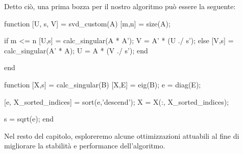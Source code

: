 Detto ciò, una prima bozza per il nostro algoritmo può essere la seguente:
\begin{programma}
function [U, s, V] = svd_custom(A)
[m,n] = size(A);

if m <= n
   	[U,s] = calc_singular(A * A');
   	V = A' * (U ./ s');
else
   	[V,s] = calc_singular(A' * A);
    U = A * (V ./ s');
end

end


function [X,s] = calc_singular(B)
[X,E] = eig(B);
e = diag(E);

[e, X_sorted_indices] = sort(e,'descend');
X = X(:, X_sorted_indices);

s = sqrt(e);
end
\end{programma}

Nel resto del capitolo, esploreremo alcune ottimizzazioni attuabili al fine di 
migliorare la stabilità e performance dell'algoritmo.


